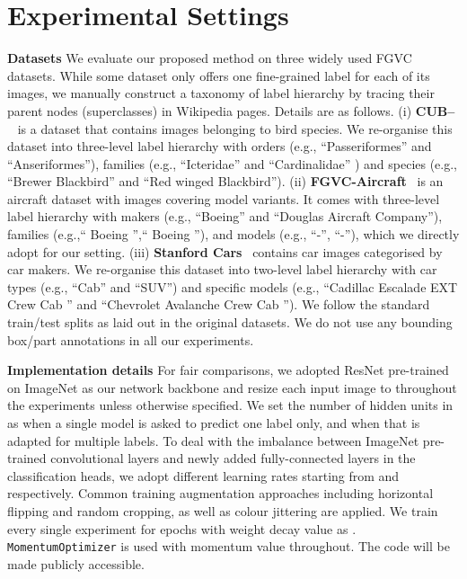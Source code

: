 \documentclass[final]{cvpr}
\newcommand{\keypoint}[1]{\vspace{0.05cm}\noindent\textbf{#1}\quad}
\begin{document}
\section{Experimental Settings}

\keypoint{Datasets} We evaluate our proposed method on three widely used FGVC datasets. While some dataset only offers one fine-grained label for each of its images, we manually construct a taxonomy of label hierarchy by tracing their parent nodes (superclasses) in Wikipedia pages. Details are as follows. (i) \textbf{CUB--}~\cite{wah2011caltech} is a dataset that contains  images belonging to  bird species. We re-organise this dataset into three-level label hierarchy with  orders (e.g., ``Passeriformes'' and ``Anseriformes''),  families (e.g.,  ``Icteridae'' and ``Cardinalidae'' ) and  species (e.g., ``Brewer Blackbird''  and ``Red winged Blackbird''). (ii) \textbf{FGVC-Aircraft}~\cite{maji13fine} is an aircraft dataset with  images covering  model variants. It comes with three-level label hierarchy with  makers (e.g., ``Boeing'' and ``Douglas Aircraft Company''),  families (e.g.,`` Boeing '',`` Boeing ''), and  models (e.g., ``-'', ``-''), which we directly adopt for our setting. (iii) \textbf{Stanford Cars}~\cite{krause20133d} contains  car images categorised by  car makers.  We re-organise this dataset into two-level label hierarchy with  car types (e.g., ``Cab'' and ``SUV'') and  specific models (e.g., ``Cadillac Escalade EXT Crew Cab '' and ``Chevrolet Avalanche Crew Cab ''). We follow the standard train/test splits as laid out in the original datasets. We do not use any bounding box/part annotations in all our experiments.

\keypoint{Implementation details} For fair comparisons, we adopted ResNet pre-trained on ImageNet as our network backbone and resize each input image to  throughout the experiments unless otherwise specified. We set the number of hidden units in  as  when a single model is asked to predict one label only, and  when that is adapted for multiple labels. To deal with the imbalance between ImageNet pre-trained convolutional layers and newly added fully-connected layers in the classification heads, we adopt different learning rates starting from  and  respectively. Common training augmentation approaches including horizontal flipping and random cropping, as well as colour jittering are applied. We train every single experiment for  epochs with weight decay value as . \texttt{MomentumOptimizer} is used with momentum value  throughout. The code will be made publicly accessible.
\end{document}
